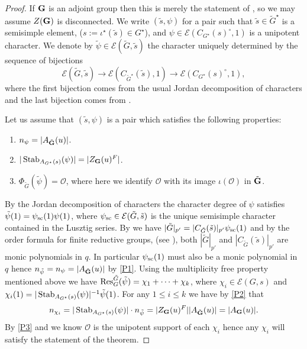 \documentclass{jt-calcs}
\renewcommand{\cref}{\Cref}
\begin{document}
\begin{proof}
If $\mathbf{G}$ is an adjoint group then this is merely the statement of \cref{thm:lusztig-hezard}, so we may assume $Z(\mathbf{G})$ is disconnected. We write $(\tilde{s},\psi)$ for a pair such that $\tilde{s} \in \tilde{G}^{\star}$ is a semisimple element, ($s:=\iota^{\star}(\tilde{s})\in G^{\star}$), and $\psi \in \mathcal{E}({C_{G^{\star}}(s)^{\circ}},1)$ is a unipotent character. We denote by $\tilde{\psi} \in \mathcal{E}(\tilde{G},\tilde{s})$ the character uniquely determined by the sequence of bijections
\begin{equation}\label{eq:bijection}
\mathcal{E}(\tilde{G},\tilde{s}) \to \mathcal{E}(C_{\tilde{G}^{\star}}(\tilde{s}),1) \to \mathcal{E}({C_{G^{\star}}(s)^{\circ}},1),
\end{equation}
where the first bijection comes from the usual Jordan decomposition of characters and the last bijection comes from \cite[Proposition 13.20]{digne-michel:1991:representations-of-finite-groups-of-lie-type}.

Let us assume that $(\tilde{s},\psi)$ is a pair which satisfies the following properties:
\begin{enumerate}[label=(P\arabic*)]
	\item $n_{\psi} = |A_{\tilde{\mathbf{G}}}(u)|$.\label{P1}
	\item $|\operatorname{Stab}_{A_{G^{\star}}(s)}(\psi)| = |Z_{\mathbf{G}}(u)^F|$.\label{P2}
	\item $\Phi_{\tilde{G}}(\tilde{\psi}) = \mathcal{O}$, where here we identify $\mathcal{O}$ with its image $\iota(\mathcal{O})$ in $\tilde{\mathbf{G}}$.\label{P3}
\end{enumerate}
By the Jordan decomposition of characters the character degree of $\psi$ satisfies $\tilde{\psi}(1) = \psi_{\operatorname{sc}}(1)\psi(1)$, where $\psi_{\operatorname{sc}} \in \mathcal{E}(\tilde{G},\tilde{s})$ is the unique semisimple character contained in the Lusztig series. By \cite[Theorem 8.4.8]{carter:1993:finite-groups-of-lie-type} we have $|\tilde{G}|_{p'} = |C_{\tilde{G}}(\tilde{s})|_{p'}\psi_{\operatorname{sc}}(1)$ and by the order formula for finite reductive groups, (see \cite[pg.\ 75]{carter:1993:finite-groups-of-lie-type}), both $|\tilde{G}|_{p'}$ and $|C_{\tilde{G}}(\tilde{s})|_{p'}$ are monic polynomials in $q$. In particular $\psi_{\operatorname{sc}}(1)$ must also be a monic polynomial in $q$ hence $n_{\tilde{\psi}}=n_{\psi} = |A_{\tilde{\mathbf{G}}}(u)|$ by \ref{P1}. Using the multiplicity free property mentioned above we have $\operatorname{Res}^{\tilde{G}}_G(\tilde{\psi}) = \chi_1 + \cdots + \chi_k$, where $\chi_i \in \mathcal{E}(G,s)$ and $\chi_i(1) = |\operatorname{Stab}_{A_{G^{\star}}(s)}(\psi)|^{-1}\tilde{\psi}(1)$. For any $1 \leqslant i \leqslant k$ we have by \ref{P2} that
\begin{equation*}
n_{\chi_i} = |\operatorname{Stab}_{A_{G^{\star}}(s)}(\psi)|\cdot n_{\tilde{\psi}} = |Z_{\mathbf{G}}(u)^F||A_{\tilde{\mathbf{G}}}(u)| = |A_{\mathbf{G}}(u)|.
\end{equation*}
By \ref{P3} and \cite[Theorem 3.7]{geck-malle:2000:existence-of-a-unipotent-support} we know $\mathcal{O}$ is the unipotent support of each $\chi_i$ hence any $\chi_i$ will satisfy the statement of the theorem.
\end{proof}
\end{document}
